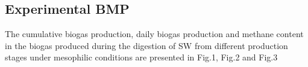 \subsection{Experimental BMP}
The cumulative biogas production, daily biogas production and methane content in the biogas produced during the digestion of SW from different production stages under mesophilic conditions are presented in Fig.1, Fig.2 and Fig.3